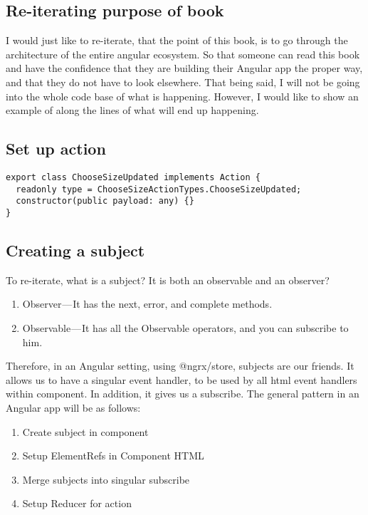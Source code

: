 \subsection{ Re-iterating purpose of book }

I would just like to re-iterate, that the point of this book, is to go through
the architecture of the entire angular ecosystem. So that someone can read this
book and have the confidence that they are building their Angular app the proper
way, and that they do not have to look elsewhere. That being said, I will not be
going into the whole code base of what is happening. However, I would like to show
an example of along the lines of what will end up happening.

\subsection{ Set up action }
\begin{lstlisting}
export class ChooseSizeUpdated implements Action {
  readonly type = ChooseSizeActionTypes.ChooseSizeUpdated;
  constructor(public payload: any) {}
}
\end{lstlisting}

\subsection{ Creating a subject }

To re-iterate, what is a subject? It is both an observable and an observer?
\begin{enumerate}
  \item Observer — It has the next, error, and complete methods.
  \item Observable — It has all the Observable operators, and you can subscribe
  to him.
\end{enumerate}

Therefore, in an Angular setting, using @ngrx/store, subjects are our friends. It
allows us to have a singular event handler, to be used by all html event handlers
within component. In addition, it gives us a subscribe. The general pattern in
an Angular app will be as follows:
\begin{enumerate}
  \item Create subject in component
  \item Setup ElementRefs in Component HTML
  \item Merge subjects into singular subscribe
  \item Setup Reducer for action
\end{enumerate}

